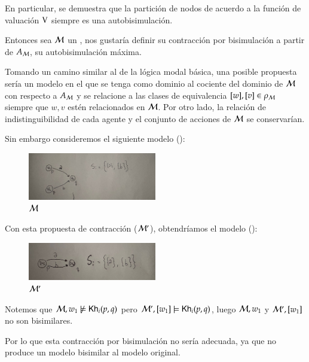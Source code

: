 En particular, se demuestra que la partición de nodos de acuerdo a la función de valuación $\mathrm{V}$ siempre es una autobisimulación.

Entonces sea $\mathcal{M}$ un \ults, nos gustaría definir su contracción por bisimulación a partir de $A_{\mathcal{M}}$, su autobisimulación máxima.

Tomando un camino similar al de la lógica modal básica, una posible propuesta sería un modelo en el que se tenga como dominio al cociente 
del dominio de $\mathcal{M}$ con respecto a $A_{\mathcal{M}}$ y se relacione a las clases de equivalencia $[w], [v] \in \rho_{\mathcal{M}}$ siempre que 
$w, v$ estén relacionados en $\mathcal{M}$. Por otro lado, la relación de indistinguibilidad de cada agente y el conjunto de acciones de $\mathcal{M}$ se conservarían.

Sin embargo consideremos el siguiente modelo ():

\begin{figure}[h]
    \centering
    \includegraphics[width=0.5\textwidth]{imagenes/1ra_propuesta_original.jpeg}
    \caption{$\mathcal{M}$}
    \label{fig:1stproposaloriginal}
\end{figure}

Con esta propuesta de contracción ($\mathcal{M}'$), obtendríamos el modelo ():

\begin{figure}[h]
    \centering
    \includegraphics[width=0.5\textwidth]{imagenes/1ra_propuesta_contraido.jpeg}
    \caption{$\mathcal{M}'$}
    \label{fig:1stproposalcontraction}
\end{figure}


Notemos que $\mathcal{M}, w_1 \not\models \mathsf{Kh}_i(p,q)$ pero $\mathcal{M}', [w_1] \models \mathsf{Kh}_i(p,q)$, luego $\mathcal{M},w_1$ y 
$\mathcal{M}',[w_1]$ no son bisimilares.

Por lo que esta contracción por bisimulación no sería adecuada, ya que no produce un modelo bisimilar al modelo original.


